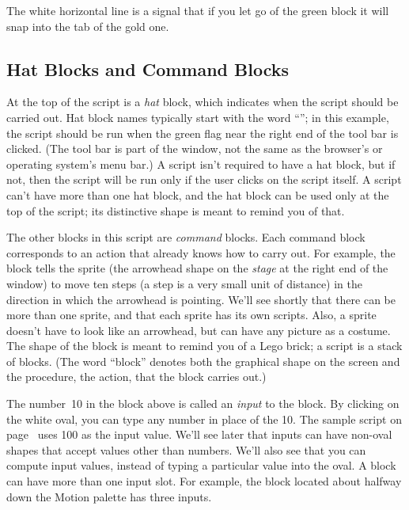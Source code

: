 \documentclass{report}
\begin{document}

The white horizontal line is a signal that if you let go of the green block it will snap into the tab of the gold one.

\subsection{Hat Blocks and Command Blocks}

At the top of the script is a \emph{hat} block, which indicates when the script should be carried out. Hat block names typically start with the word ``''; in this example, the script should be run when the green flag near the right end of the \Snap{} tool bar is clicked. (The \Snap{} tool bar is part of the \Snap{} window, not the same as the browser's or operating system's menu bar.) A script isn't required to have a hat block, but if not, then the script will be run only if the user clicks on the script itself. A script can't have more than one hat block, and the hat block can be used only at the top of the script; its distinctive shape is meant to remind you of that.

The other blocks in this script are \emph{command} blocks. Each command block corresponds to an action that \Snap{} already knows how to carry out. For example, the block  tells the sprite (the arrowhead shape on the \emph{stage} at the right end of the window) to move ten steps (a step is a very small unit of distance) in the direction in which the arrowhead is pointing. We'll see shortly that there can be more than one sprite, and that each sprite has its own scripts. Also, a sprite doesn't have to look like an arrowhead, but can have any picture as a costume. The shape of the  block is meant to remind you of a Lego\texttrademark{} brick; a script is a stack of blocks. (The word ``block'' denotes both the graphical shape on the screen and the procedure, the action, that the block carries out.)

The number~10 in the  block above is called an \emph{input} to the block. By clicking on the white oval, you can type any number in place of the 10. The sample script on page~\pageref{fig:typical-script} uses 100 as the input value. We'll see later that inputs can have non-oval shapes that accept values other than numbers. We'll also see that you can compute input values, instead of typing a particular value into the oval. A block can have more than one input slot. For example, the  block located about halfway down the Motion palette has three inputs.
\end{document}
